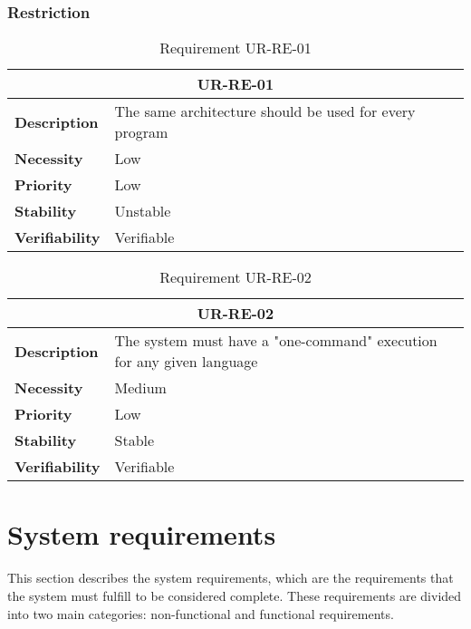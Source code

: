 \subsubsection{Restriction}

\begin{table}[H]
    \centering
    \begin{tabular}{l p{10cm}}
        \toprule
        \multicolumn{2}{c}{UR-RE-01} \\
        \toprule
        \textbf{Description}        &  The same architecture should be used for every program \\
        \textbf{Necessity}          &  Low \\
        \textbf{Priority}           &  Low \\
        \textbf{Stability}          &  Unstable \\
        \textbf{Verifiability}      &  Verifiable \\
    \end{tabular}
    \caption{Requirement UR-RE-01}
    \label{tab:ur-re-01}
\end{table}

\begin{table}[H]
    \centering
    \begin{tabular}{l p{10cm}}
        \toprule
        \multicolumn{2}{c}{UR-RE-02} \\
        \toprule
        \textbf{Description}        & The system must have a "one-command" execution for any given language \\
        \textbf{Necessity}          & Medium   \\
        \textbf{Priority}           & Low   \\
        \textbf{Stability}          & Stable \\
        \textbf{Verifiability}      & Verifiable \\
    \end{tabular}
    \caption{Requirement UR-RE-02}
    \label{tab:ur-re-02}
\end{table}


\section{System requirements}

This section describes the system requirements, which are the requirements that the system must fulfill to be considered complete. These requirements are divided into two main categories: non-functional and functional requirements.

